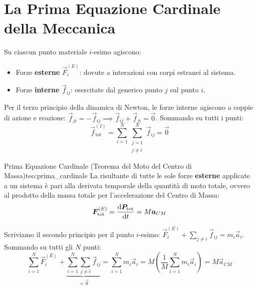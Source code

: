 \section{La Prima Equazione Cardinale della Meccanica}
\label{sec:prima_cardinale}

Su ciascun punto materiale $i$-esimo agiscono:
\begin{itemize}
    \item Forze \textbf{esterne} $\vec{F}_i^{(E)}$: dovute a interazioni con corpi estranei al sistema.
    \item Forze \textbf{interne} $\vec{f}_{ij}$: esercitate dal generico punto $j$ sul punto $i$.
\end{itemize}
Per il terzo principio della dinamica di Newton, le forze interne agiscono a coppie di azione e reazione: $\vec{f}_{ji} = -\vec{f}_{ij} \implies \vec{f}_{ij} + \vec{f}_{ji} = \vec{0}$. Sommando su tutti i punti:
\begin{equation}
    \vec{f}_{\text{tot}}^{(I)} = \sum_{i=1}^N \sum_{\substack{j=1 \\ j \neq i}}^N \vec{f}_{ij} = \vec{0}
    \label{eq:risultante_interna_nulla}
\end{equation}

\begin{teorema}{Prima Equazione Cardinale (Teorema del Moto del Centro di Massa)}{teo:prima_cardinale}
La risultante di tutte le sole forze \textbf{esterne} applicate a un sistema è pari alla derivata temporale della quantità di moto totale, ovvero al prodotto della massa totale per l'accelerazione del Centro di Massa:
\begin{equation}
    \bm{F}_{\text{tot}}^{(E)} = \frac{\mathrm{d} \bm{P}_{\text{tot}}}{\mathrm{d} t} = M\bm{a}_{CM}
    \label{eq:prima_cardinale}
\end{equation}
\end{teorema}

\begin{dimostrazione}
Scriviamo il secondo principio per il punto $i$-esimo: $\vec{F}_i^{(E)} + \sum_{j \neq i} \vec{f}_{ij} = m_i \vec{a}_i$. Sommando su tutti gli $N$ punti:
\begin{equation}
    \sum_{i=1}^N \vec{F}_i^{(E)} + \underbrace{\sum_{i=1}^N \sum_{j \neq i} \vec{f}_{ij}}_{=\vec{0}} = \sum_{i=1}^N m_i \vec{a}_i = M \left(\frac{1}{M}\sum_{i=1}^N m_i \vec{a}_i\right) = M\vec{a}_{CM}
\end{equation}
\end{dimostrazione}

